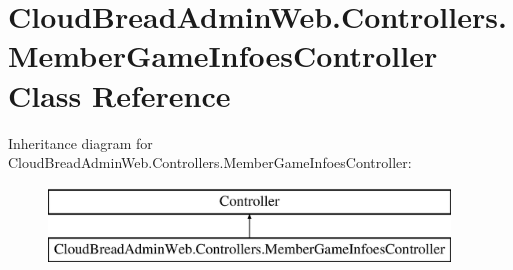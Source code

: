 \hypertarget{a00138}{}\section{Cloud\+Bread\+Admin\+Web.\+Controllers.\+Member\+Game\+Infoes\+Controller Class Reference}
\label{a00138}
Inheritance diagram for Cloud\+Bread\+Admin\+Web.\+Controllers.\+Member\+Game\+Infoes\+Controller\+:\begin{figure}[H]
\begin{center}
\leavevmode
\includegraphics[height=2.000000cm]{a00138}
\end{center}
\end{figure}
